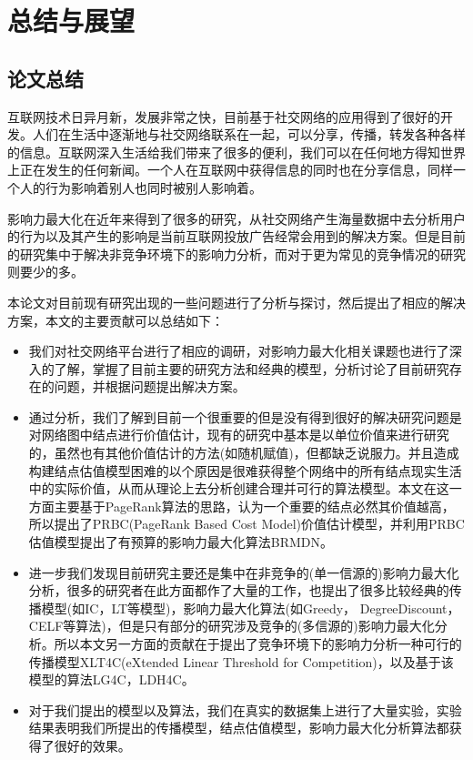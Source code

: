 

\chapter{总结与展望}
\label{cha:5thChap}

\section{论文总结}
互联网技术日异月新，发展非常之快，目前基于社交网络的应用得到了很好的开发。人们在生活中逐渐地与社交网络联系在一起，可以分享，传播，转发各种各样的信息。互联网深入生活给我们带来了很多的便利，我们可以在任何地方得知世界上正在发生的任何新闻。一个人在互联网中获得信息的同时也在分享信息，同样一个人的行为影响着别人也同时被别人影响着。

影响力最大化在近年来得到了很多的研究，从社交网络产生海量数据中去分析用户的行为以及其产生的影响是当前互联网投放广告经常会用到的解决方案。但是目前的研究集中于解决非竞争环境下的影响力分析，而对于更为常见的竞争情况的研究则要少的多。

本论文对目前现有研究出现的一些问题进行了分析与探讨，然后提出了相应的解决方案，本文的主要贡献可以总结如下：

\begin{itemize}
\item 我们对社交网络平台进行了相应的调研，对影响力最大化相关课题也进行了深入的了解，掌握了目前主要的研究方法和经典的模型，分析讨论了目前研究存在的问题，并根据问题提出解决方案。
\item 通过分析，我们了解到目前一个很重要的但是没有得到很好的解决研究问题是对网络图中结点进行价值估计，现有的研究中基本是以单位价值来进行研究的，虽然也有其他价值估计的方法(如随机赋值)，但都缺乏说服力。并且造成构建结点估值模型困难的以个原因是很难获得整个网络中的所有结点现实生活中的实际价值，从而从理论上去分析创建合理并可行的算法模型。本文在这一方面主要基于PageRank算法的思路，认为一个重要的结点必然其价值越高，所以提出了PRBC(PageRank Based Cost Model)价值估计模型，并利用PRBC估值模型提出了有预算的影响力最大化算法BRMDN。
\item 进一步我们发现目前研究主要还是集中在非竞争的(单一信源的)影响力最大化分析，很多的研究者在此方面都作了大量的工作，也提出了很多比较经典的传播模型(如IC，LT等模型)，影响力最大化算法(如Greedy， DegreeDiscount，CELF等算法)，但是只有部分的研究涉及竞争的(多信源的)影响力最大化分析。所以本文另一方面的贡献在于提出了竞争环境下的影响力分析一种可行的传播模型XLT4C(eXtended Linear Threshold for Competition)，以及基于该模型的算法LG4C，LDH4C。
\item 对于我们提出的模型以及算法，我们在真实的数据集上进行了大量实验，实验结果表明我们所提出的传播模型，结点估值模型，影响力最大化分析算法都获得了很好的效果。
\end{itemize}

